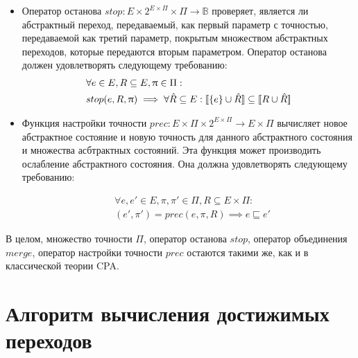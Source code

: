 \begin{itemize}
\item Оператор останова $stop: E \times 2^{E \times \Pi} \times \Pi \rightarrow \mathbb{B}$ проверяет, является ли абстрактный переход, передаваемый, как первый параметр с точностью, передаваемой как третий параметр, покрытым множеством абстрактных переходов, которые передаются вторым параметром.
Оператор останова должен удовлетворять следующему требованию:
\begin{equation}
\label{cpa_stop_eq}
\begin{aligned}
&\forall e \in E, R \subseteq E, \uppi \in \Pi:\\
&stop(e, R, \uppi) \implies\forall \hat R \subseteq E: [\![ \{e\}\cup \hat R ]\!] \subseteq [\![ R \cup \hat R ]\!]
\end{aligned}
\end{equation}

\item Функция настройки точности $prec:E \times \Pi \times 2^{E \times \Pi} \rightarrow E \times \Pi$ вычисляет новое абстрактное состояние и новую точность для данного абстрактного состояния и множества асбтрактных состояний.
Эта функция может производить ослабление абстрактного состояния.
Она должна удовлетворять следующему требованию:

\begin{equation}
\label{cpa_prec_eq}
\begin{aligned}
& \forall e, e' \in E, \pi, \pi' \in \Pi, R \subseteq E \times \Pi:\\
& (e', \pi') = prec(e, \pi, R) \implies e \sqsubseteq e'
\end{aligned}
\end{equation}

\end{itemize}

В целом, множество точности $\Pi$, оператор останова $stop$, оператор объединения $merge$, оператор настройки точности $prec$ остаются такими же, как и в классической теории CPA.

\section{Алгоритм вычисления достижимых переходов}

